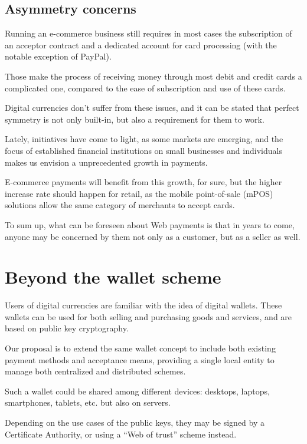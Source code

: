 \subsection{Asymmetry concerns}\label{asymmetry-concerns}

Running an e-commerce business still requires in most cases the
subscription of an acceptor contract and a dedicated account for card
processing (with the notable exception of PayPal).

Those make the process of receiving money through most debit and credit
cards a complicated one, compared to the ease of subscription and use of
these cards.

Digital currencies don't suffer from these issues, and it can be stated
that perfect symmetry is not only built-in, but also a requirement for
them to work.

Lately, initiatives have come to light, as some markets are emerging,
and the focus of established financial institutions on small businesses
and individuals makes us envision a unprecedented growth in payments.

E-commerce payments will benefit from this growth, for sure, but the
higher increase rate should happen for retail, as the mobile
point-of-sale (mPOS) solutions allow the same category of merchants to
accept cards.

To sum up, what can be foreseen about Web payments is that in years to
come, anyone may be concerned by them not only as a customer, but as a
seller as well.

\section{Beyond the wallet scheme}\label{beyond-the-wallet-scheme}

Users of digital currencies are familiar with the idea of digital
wallets. These wallets can be used for both selling and purchasing goods
and services, and are based on public key cryptography.

Our proposal is to extend the same wallet concept to include both
existing payment methods and acceptance means, providing a single local
entity to manage both centralized and distributed schemes.

Such a wallet could be shared among different devices: desktops,
laptops, smartphones, tablets, etc. but also on servers.

Depending on the use cases of the public keys, they may be signed by a
Certificate Authority, or using a ``Web of trust'' scheme instead.

